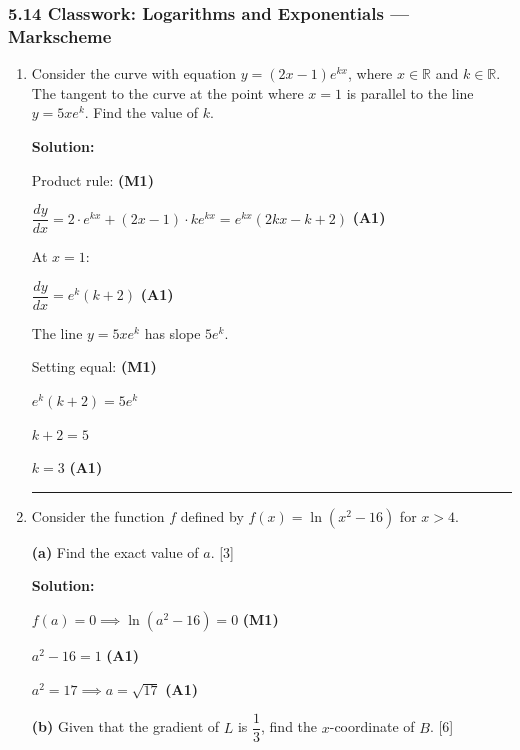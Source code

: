 \documentclass[12pt, twoside]{article}
\begin{document}
\subsubsection*{5.14 Classwork: Logarithms and Exponentials --- Markscheme}

\begin{enumerate}[itemsep=0.3cm]

\item[1.] [Maximum mark: 5]

Consider the curve with equation $y = (2x - 1)e^{kx}$,
where $x \in \mathbb{R}$ and $k \in \mathbb{R}$.
The tangent to the curve at the point where $x = 1$
is parallel to the line $y = 5xe^k$.
Find the value of $k$.

\textbf{Solution:}

Product rule: \hfill \textbf{(M1)}

$\dfrac{dy}{dx} = 2 \cdot e^{kx} + (2x - 1) \cdot ke^{kx}
= e^{kx}(2kx - k + 2)$ \hfill \textbf{(A1)}

At $x = 1$:

$\dfrac{dy}{dx} = e^k(k + 2)$ \hfill \textbf{(A1)}

The line $y = 5xe^k$ has slope $5e^k$.

Setting equal: \hfill \textbf{(M1)}

$e^k(k + 2) = 5e^k$

$k + 2 = 5$

$k = 3$ \hfill \textbf{(A1)}

\bigskip
\hrule
\bigskip

\item[2.] [Maximum mark: 9]

Consider the function $f$ defined by
$f(x) = \ln(x^2 - 16)$ for $x > 4$.

\medskip

\textbf{(a)} Find the exact value of $a$. \hfill [3]

\textbf{Solution:}

$f(a) = 0 \implies \ln(a^2 - 16) = 0$ \hfill \textbf{(M1)}

$a^2 - 16 = 1$ \hfill \textbf{(A1)}

$a^2 = 17 \implies a = \sqrt{17}$ \hfill \textbf{(A1)}

\medskip

\textbf{(b)} Given that the gradient of $L$ is $\dfrac{1}{3}$,
find the $x$-coordinate of $B$. \hfill [6]


\end{enumerate}
\end{document}
